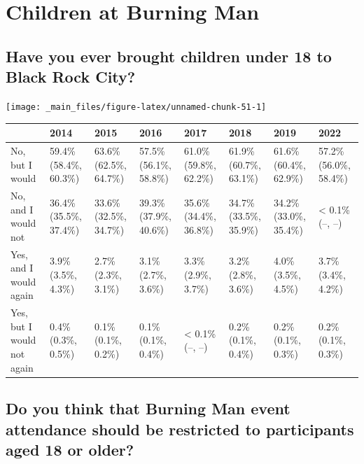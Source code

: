 \documentclass[
]{book}
\begin{document}
\hypertarget{children-at-burning-man}{%
\section{Children at Burning Man}\label{children-at-burning-man}}

\hypertarget{have-you-ever-brought-children-under-18-to-black-rock-city}{%
\subsection{Have you ever brought children under 18 to Black Rock City?}\label{have-you-ever-brought-children-under-18-to-black-rock-city}}

\texttt{[image: \_main\_files/figure-latex/unnamed-chunk-51-1]}

\begin{table}
\centering
\begin{tabular}[t]{>{}l|>{}l|>{}l|>{}l|>{}l|>{}l|>{}l|>{}l}
\hline
  & 2014 & 2015 & 2016 & 2017 & 2018 & 2019 & 2022\\
\hline
No, but I would & 59.4\% (58.4\%, 60.3\%) & 63.6\% (62.5\%, 64.7\%) & 57.5\% (56.1\%, 58.8\%) & 61.0\% (59.8\%, 62.2\%) & 61.9\% (60.7\%, 63.1\%) & 61.6\% (60.4\%, 62.9\%) & 57.2\% (56.0\%, 58.4\%)\\
\hline
No, and I would not & 36.4\% (35.5\%, 37.4\%) & 33.6\% (32.5\%, 34.7\%) & 39.3\% (37.9\%, 40.6\%) & 35.6\% (34.4\%, 36.8\%) & 34.7\% (33.5\%, 35.9\%) & 34.2\% (33.0\%, 35.4\%) & < 0.1\% (--, --)\\
\hline
Yes, and I would again & 3.9\% (3.5\%, 4.3\%) & 2.7\% (2.3\%, 3.1\%) & 3.1\% (2.7\%, 3.6\%) & 3.3\% (2.9\%, 3.7\%) & 3.2\% (2.8\%, 3.6\%) & 4.0\% (3.5\%, 4.5\%) & 3.7\% (3.4\%, 4.2\%)\\
\hline
Yes, but I would not again & 0.4\% (0.3\%, 0.5\%) & 0.1\% (0.1\%, 0.2\%) & 0.1\% (0.1\%, 0.4\%) & < 0.1\% (--, --) & 0.2\% (0.1\%, 0.4\%) & 0.2\% (0.1\%, 0.3\%) & 0.2\% (0.1\%, 0.3\%)\\
\hline
\end{tabular}
\end{table}

\hypertarget{do-you-think-that-burning-man-event-attendance-should-be-restricted-to-participants-aged-18-or-older}{%
\subsection{Do you think that Burning Man event attendance should be restricted to participants aged 18 or older?}\label{do-you-think-that-burning-man-event-attendance-should-be-restricted-to-participants-aged-18-or-older}}
\end{document}
